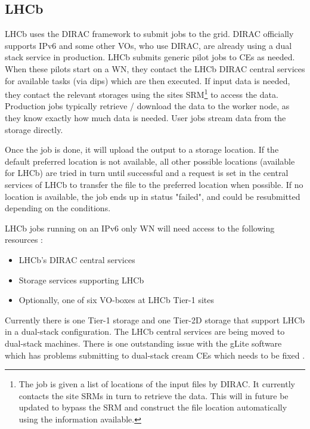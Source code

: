 \documentclass[11pt]{article}
\begin{document}


\subsection{LHCb}
LHCb uses the DIRAC framework to submit jobs to the grid. DIRAC officially supports IPv6 and some other VOs, who use DIRAC, are already using a dual stack service in production.  LHCb submits generic pilot jobs to CEs as needed. When these pilots start on a WN, they contact the LHCb DIRAC central services for available tasks (via dips) which are then executed. If input data is needed, they contact the relevant storages using the sites SRM\footnote{The job is given a list of locations of the input files by DIRAC. It currently contacts the site SRMs in turn to retrieve the data. This will in future be updated to bypass the SRM and construct the file location automatically using the information available.} to access the data.  Production jobs typically retrieve / download the data to the worker node, as they know exactly how much data is needed. User jobs stream data from the storage directly.

Once the job is done, it will upload the output to a storage location. If the default preferred location is not available, all other possible locations (available for LHCb) are tried in turn until successful and a request is set in the central services of LHCb to transfer the file to the preferred location when possible. If no location is available, the job ends up in status "failed", and could be resubmitted depending on the conditions.

LHCb jobs running on an IPv6 only WN will need access to the following resources :
\begin{itemize}
\item LHCb's DIRAC central services
\item Storage services supporting LHCb
\item Optionally, one of six VO-boxes at LHCb Tier-1 sites
\end{itemize}
Currently there is one Tier-1 storage and one Tier-2D storage that support LHCb in a dual-stack configuration.  The LHCb central services are being moved to dual-stack machines.  There is one outstanding issue with the gLite software which has problems submitting to dual-stack cream CEs which needs to be fixed \cite{CreamCEBug}.
\end{document}
